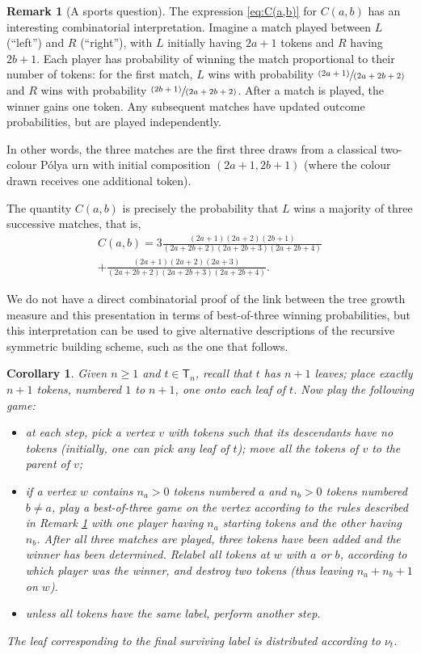 \documentclass[11pt]{article}
\newcommand{\pspfrac}[2]{\sfrac{(#1)}{(#2)}}
\newcommand{\sT}{\mathsf{T}}
\newtheorem{cor}[thm]{Corollary}
\theoremstyle{definition}
\newtheorem{rem}[thm]{Remark}
\begin{document}
\begin{rem}[A sports question] \label{rem:best of three}
The expression \eqref{eq:C(a,b)} for $C(a,b)$ has an interesting combinatorial interpretation. Imagine a match played between $L$ (``left'') and $R$ (``right''), with $L$ initially having $2a+1$ tokens and $R$ having $2b+1$. Each player has probability of winning the match proportional to their number of tokens: for the first match, $L$ wins with probability $\pspfrac{2a+1}{2a+2b+2}$ and $R$ wins with probability $\pspfrac{2b+1}{2a+2b+2}$. After a match is played, the winner gains one token. Any subsequent matches have updated outcome probabilities, but are played independently.

In other words, the three matches are the first three draws from a classical two-colour Pólya urn with initial composition $(2a+1,2b+1)$ (where the colour drawn receives one additional token).

The quantity $C(a,b)$ is precisely the probability that $L$ wins a majority of three successive matches, that is,
\begin{multline*}
C(a,b)=3\frac{(2a+1)(2a+2)(2b+1)}{(2a+2b+2)(2a+2b+3)(2a+2b+4)}\\
+\frac{(2a+1)(2a+2)(2a+3)}{(2a+2b+2)(2a+2b+3)(2a+2b+4)}.
\end{multline*}

We do not have a direct combinatorial proof of the link between the tree growth measure and this presentation in terms of best-of-three winning probabilities, but this interpretation can be used to give alternative descriptions of the recursive symmetric building scheme, such as the one that follows.
\end{rem}

\begin{cor}
Given $n\geq 1$ and $t\in\sT_n$, recall that $t$ has $n+1$ leaves; place exactly $n+1$ tokens, numbered $1$ to $n+1$, one onto each leaf of $t$. Now play the following game:
\begin{itemize}
\item at each step, pick a vertex $v$ with tokens such that its descendants have no tokens (initially, one can pick any leaf of $t$); move all the tokens of $v$ to the parent of $v$;
\item if a vertex $w$ contains $n_a>0$ tokens numbered $a$ and $n_b>0$ tokens numbered $b\neq a$, play a best-of-three game on the vertex according to the rules described in Remark \ref{rem:best of three} with one player having $n_a$ starting tokens and the other having $n_b$. After all three matches are played, three tokens have been added and the winner has been determined. Relabel all tokens at $w$ with $a$ or $b$, according to which player was the winner, and destroy two tokens (thus leaving $n_a+n_b+1$ on $w$).
\item unless all tokens have the same label, perform another step.
\end{itemize}

The leaf corresponding to the final surviving label is distributed according to $\nu_t$.
\end{cor}
\end{document}
